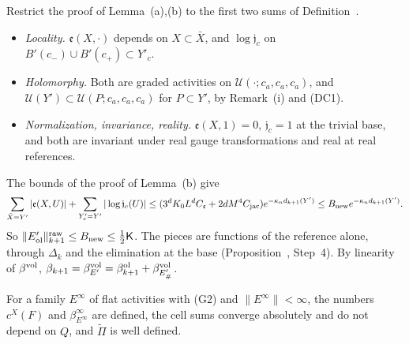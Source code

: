 \begin{step}[(ii)]
Restrict the proof of Lemma~(a),(b) to the first two sums of Definition~.
\begin{itemize}
\item \emph{Locality.} $\mathfrak e(X,\cdot)$ depends on $X\subset\bar X$, and $\log\mathfrak j_c$ on $B'(c_-)\cup B'(c_+)\subset Y'_c$.
\item \emph{Holomorphy.} Both are graded activities on $\mathcal U(\cdot;c_a,c_a,c_a)$, and $\mathcal U(Y')\subset\mathcal U(P;c_a,c_a,c_a)$ for $P\subset Y'$, by Remark~(i) and (DC1).
\item \emph{Normalization, invariance, reality.} $\mathfrak e(X,1)=0$, $\mathfrak j_c=1$ at the trivial base, and both are invariant under real gauge transformations and real at real references.
\end{itemize}
The bounds of the proof of Lemma~(b) give
\[
\sum_{\bar X=Y'}|\mathfrak e(X,U)|+\sum_{Y'_c=Y'}|\log\mathfrak j_c(U)|\le(3^dK_0L^dC_{\mathfrak e}+2dM^4C_{\rm jac})e^{-\kappa_nd_{k+1}(Y')}\le B_{\rm new}e^{-\kappa_nd_{k+1}(Y')} .
\]
So $\|E'_{\rm ol}\|^{\rm raw}_{k+1}\le B_{\rm new}\le\frac12\mathsf K$. The pieces are functions of the reference alone, through $\Delta_k$ and the elimination at the base (Proposition~, Step~4). By linearity of $\beta^{\rm vol}$, $\beta_{k+1}=\beta^{\rm vol}_{E'}=\beta^{\rm ol}_{k+1}+\beta^{\rm vol}_{E'_\#}$.
\end{step}

\begin{detail}\label{d11b:flat-activities}
For a family $E^\infty$ of flat activities with (G2) and $\|E^\infty\|<\infty$, the numbers $c^X(F)$ and $\beta^\infty_{E^\infty}$ are defined, the cell sums converge absolutely and do not depend on $Q$, and $\widetilde\Pi$ is well defined.
\end{detail}

